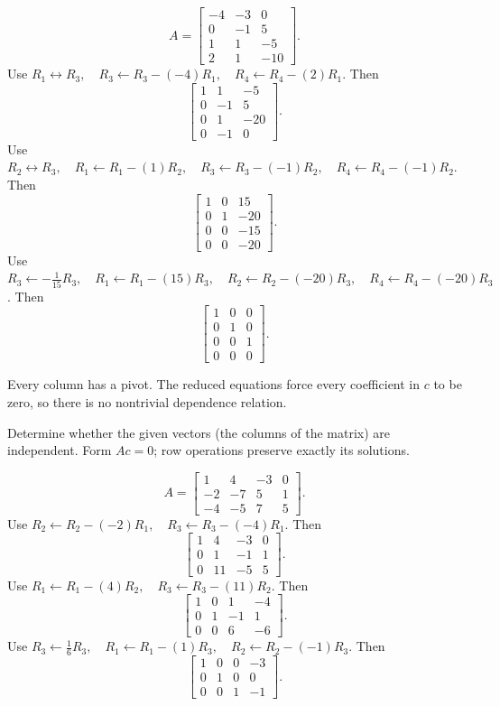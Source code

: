 \[ A=\begin{bmatrix}-4 & -3 & 0\\0 & -1 & 5\\1 & 1 & -5\\2 & 1 & -10\end{bmatrix}.\]
Use $R_{1}\leftrightarrow R_{3},\quad R_{3}\leftarrow R_{3}-(-4)R_{1},\quad R_{4}\leftarrow R_{4}-(2)R_{1}$. Then
\[ \begin{bmatrix}1 & 1 & -5\\0 & -1 & 5\\0 & 1 & -20\\0 & -1 & 0\end{bmatrix}.\]
Use $R_{2}\leftrightarrow R_{3},\quad R_{1}\leftarrow R_{1}-(1)R_{2},\quad R_{3}\leftarrow R_{3}-(-1)R_{2},\quad R_{4}\leftarrow R_{4}-(-1)R_{2}$. Then
\[ \begin{bmatrix}1 & 0 & 15\\0 & 1 & -20\\0 & 0 & -15\\0 & 0 & -20\end{bmatrix}.\]
Use $R_{3}\leftarrow - \frac{1}{15}R_{3},\quad R_{1}\leftarrow R_{1}-(15)R_{3},\quad R_{2}\leftarrow R_{2}-(-20)R_{3},\quad R_{4}\leftarrow R_{4}-(-20)R_{3}$. Then
\[ \begin{bmatrix}1 & 0 & 0\\0 & 1 & 0\\0 & 0 & 1\\0 & 0 & 0\end{bmatrix}.\]

Every column has a pivot. The reduced equations force every coefficient in $c$ to be zero, so there is no nontrivial dependence relation.



\goal Determine whether the given vectors (the columns of the matrix) are independent. Form $Ac=0$; row operations preserve exactly its solutions.

\[ A=\begin{bmatrix}1 & 4 & -3 & 0\\-2 & -7 & 5 & 1\\-4 & -5 & 7 & 5\end{bmatrix}.\]
Use $R_{2}\leftarrow R_{2}-(-2)R_{1},\quad R_{3}\leftarrow R_{3}-(-4)R_{1}$. Then
\[ \begin{bmatrix}1 & 4 & -3 & 0\\0 & 1 & -1 & 1\\0 & 11 & -5 & 5\end{bmatrix}.\]
Use $R_{1}\leftarrow R_{1}-(4)R_{2},\quad R_{3}\leftarrow R_{3}-(11)R_{2}$. Then
\[ \begin{bmatrix}1 & 0 & 1 & -4\\0 & 1 & -1 & 1\\0 & 0 & 6 & -6\end{bmatrix}.\]
Use $R_{3}\leftarrow \frac{1}{6}R_{3},\quad R_{1}\leftarrow R_{1}-(1)R_{3},\quad R_{2}\leftarrow R_{2}-(-1)R_{3}$. Then
\[ \begin{bmatrix}1 & 0 & 0 & -3\\0 & 1 & 0 & 0\\0 & 0 & 1 & -1\end{bmatrix}.\]

